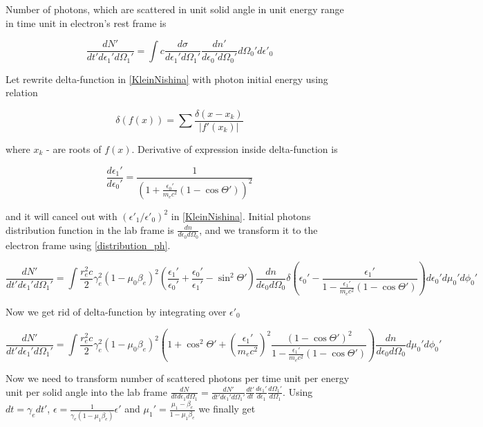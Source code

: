 Number of photons, which are scattered in unit solid angle in unit energy range in time unit in electron's rest frame is 

\begin{equation}
\frac{dN'}{dt'd\epsilon_1'd\Omega_1'}=\int c \frac{d\sigma}{d\epsilon_1'd\Omega_1'} \frac{dn'}{d\epsilon_0'd\Omega_0'}d\Omega_0'd\epsilon'_0
\end{equation}

Let rewrite delta-function in \ref{KleinNishina} with photon initial energy using relation

\begin{equation}
	\delta(f(x)) = \sum \frac{\delta(x-x_k)}{|f'(x_k)|}
\end{equation}

where $x_k$ - are roots of $f(x)$. Derivative of expression inside delta-function is

\begin{equation}
	\frac{d\epsilon_1'}{d\epsilon_0'}=\frac{1}{(1+\frac{\epsilon_0'}{m_e c^2}(1 - \cos \Theta'))^2}
\end{equation}

and it will cancel out with $\left(\epsilon'_1/\epsilon'_0\right)^2$ in \ref{KleinNishina}. Initial photons distribution function in the lab frame is $\frac{dn}{d \epsilon_0 d \Omega_0}$, and we transform it to the electron frame using \ref{distribution_ph}.

\begin{equation}
	\frac{dN'}{dt'd\epsilon_1'd\Omega_1'}=\int \frac{r_e^2 c}{2} \gamma_e^2 (1 - \mu_0 \beta_e)^2 \left(\frac{\epsilon_1'}{\epsilon_0'}+\frac{\epsilon_0'}{\epsilon_1'}-\sin^2\Theta'\right)\frac{dn}{d\epsilon_0 d\Omega_0} \delta\left(\epsilon_0' - \frac{\epsilon_1'}{1-\frac{\epsilon_1'}{m_e c^2}(1 - \cos \Theta')}\right) d\epsilon_0'd\mu_0' d\phi_0'
\end{equation}

Now we get rid of delta-function by integrating over $\epsilon'_0$

\begin{equation}
	\frac{dN'}{dt'd\epsilon_1'd\Omega_1'}=\int \frac{r_e^2 c}{2} \gamma_e^2 (1 - \mu_0 \beta_e)^2 \left(1 + \cos^2\Theta'+\left(\frac{\epsilon_1'}{m_e c^2}\right)^2\frac{(1-\cos\Theta')^2}{1-\frac{\epsilon_1'}{m_e c^2}(1 - \cos \Theta')}\right)\frac{dn}{d\epsilon_0 d\Omega_0}d\mu_0' d\phi_0'
\end{equation}

Now we need to transform number of scattered photons per time unit per energy unit per solid angle into the lab frame
$\frac{dN}{dt d\epsilon_1 d\Omega_1} = \frac{dN'}{dt' d\epsilon_1' d\Omega_1'}\frac{dt'}{dt}\frac{d\epsilon_1'}{d\epsilon_1}\frac{d\Omega_1'}{d\Omega_1}$. Using $dt = \gamma_e dt'$, $\epsilon = \frac{1}{\gamma_e(1 -\mu_1\beta_e)}\epsilon'$ and $\mu_1' = \frac{\mu_1-\beta_e}{1-\mu_1 \beta_e}$ we finally get

